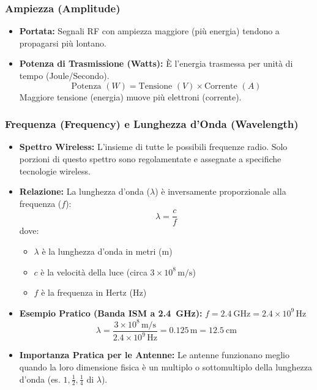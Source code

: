 \subsubsection{Ampiezza (Amplitude)}
\begin{itemize}
    \item \textbf{Portata:} Segnali RF con ampiezza maggiore (più energia) tendono a propagarsi più lontano.
    \item \textbf{Potenza di Trasmissione (Watts):} È l'energia trasmessa per unità di tempo (Joule/Secondo).
    \[ \text{Potenza } (W) = \text{Tensione } (V) \times \text{Corrente } (A) \]
    Maggiore tensione (energia) muove più elettroni (corrente).
\end{itemize}

\subsubsection{Frequenza (Frequency) e Lunghezza d'Onda (Wavelength)}
\begin{itemize}
    \item \textbf{Spettro Wireless:} L'insieme di tutte le possibili frequenze radio. Solo porzioni di questo spettro sono regolamentate e assegnate a specifiche tecnologie wireless.
    \item \textbf{Relazione:} La lunghezza d'onda ($\lambda$) è inversamente proporzionale alla frequenza ($f$):
    \[ \lambda = \frac{c}{f} \]
    dove:
    \begin{itemize}
        \item $\lambda$ è la lunghezza d'onda in metri (m)
        \item $c$ è la velocità della luce (circa $3 \times 10^8 \, \text{m/s}$)
        \item $f$ è la frequenza in Hertz (Hz)
    \end{itemize}
    \item \textbf{Esempio Pratico (Banda ISM a \SI{2.4}{\giga\hertz}):}
    $f = \SI{2.4}{\giga\hertz} = 2.4 \times 10^9 \, \text{Hz}$
    \[ \lambda = \frac{3 \times 10^8 \, \text{m/s}}{2.4 \times 10^9 \, \text{Hz}} = 0.125 \, \text{m} = \SI{12.5}{\centi\meter} \]
    \item \textbf{Importanza Pratica per le Antenne:} Le antenne funzionano meglio quando la loro dimensione fisica è un multiplo o sottomultiplo della lunghezza d'onda (es. $1, \frac{1}{2}, \frac{1}{4}$ di $\lambda$).
\end{itemize}
\begin{center}
\end{center}

